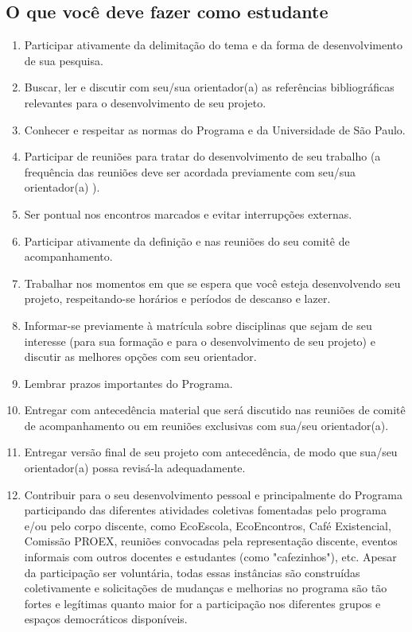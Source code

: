\subsection{O que você deve fazer como estudante}
\begin{enumerate}
\item Participar ativamente da delimitação do tema e da forma de
  desenvolvimento de sua pesquisa.
\item Buscar, ler e discutir com seu/sua orientador(a) as referências
  bibliográficas relevantes para o desenvolvimento de seu projeto.
\item Conhecer e respeitar as normas do Programa e da Universidade de São Paulo.
\item Participar de reuniões para tratar do desenvolvimento de seu
  trabalho (a frequência das reuniões deve ser acordada previamente
  com seu/sua orientador(a) ).
\item Ser pontual nos encontros marcados e evitar interrupções externas.
\item Participar ativamente da definição e nas reuniões do seu comitê
  de acompanhamento.
\item Trabalhar nos momentos em que se espera que você esteja
  desenvolvendo seu projeto, respeitando-se horários e períodos de
  descanso e lazer.
\item Informar-se previamente à matrícula sobre disciplinas que sejam
  de seu interesse (para sua formação e para o desenvolvimento de seu
  projeto) e discutir as melhores opções com seu orientador.
\item Lembrar prazos importantes do Programa.
\item Entregar com antecedência material que será discutido nas
  reuniões de comitê de acompanhamento ou em reuniões exclusivas com
  sua/seu orientador(a).
\item Entregar versão final de seu projeto com antecedência, de modo
  que sua/seu orientador(a) possa revisá-la adequadamente.
\item Contribuir para o seu desenvolvimento pessoal e principalmente
  do Programa participando das diferentes atividades coletivas
  fomentadas pelo programa e/ou pelo corpo discente, como EcoEscola,
  EcoEncontros, Café Existencial, Comissão PROEX, reuniões convocadas
  pela representação discente, eventos informais com outros docentes e
  estudantes (como "cafezinhos"), etc. Apesar da participação ser
  voluntária, todas essas instâncias são construídas coletivamente e
  solicitações de mudanças e melhorias no programa são tão fortes e
  legítimas quanto maior for a participação nos diferentes grupos
  e espaços democráticos disponíveis.
\end{enumerate}

